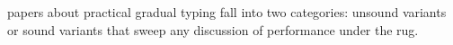 
papers about practical gradual typing fall into two categories: unsound
variants or sound variants that sweep any discussion of performance under
the rug. 
